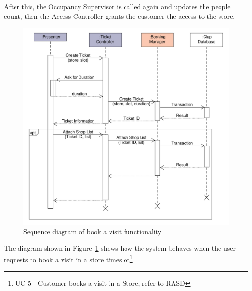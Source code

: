 After this, the Occupancy Supervisor is called again and updates the people count, then the Access Controller grants the customer the access to the store.
\begin{figure}[H]
    \includegraphics[width=\textwidth]{Images/UML_user_book_visit.pdf}
    \caption{\label{fig:UML_user_book_visit}Sequence diagram of book a visit functionality}
\end{figure}
The diagram shown in Figure~\ref{fig:UML_user_book_visit} shows how the system behaves when the user requests to book a visit in a store timeslot\footnote{UC 5 - Customer books a visit in a Store, refer to RASD}

